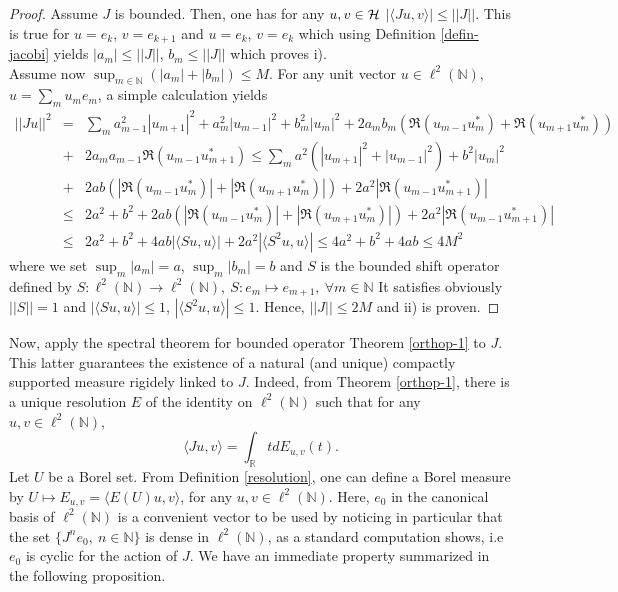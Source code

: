 \documentclass[a4paper,11pt,twoside]{article}
\numberwithin{equation}{section}
\theoremstyle{nonumberplain}
\newtheorem{proof}{Proof}
\begin{document}
\begin{proof}
Assume $J$ is bounded. Then, one has for any $u,v\in\cal{H}$ $|\langle Ju,v \rangle|\le ||J||$. This is true for $u=e_k$, $v=e_{k+1}$ and $u=e_k$, $v=e_k$ which using Definition \ref{defin-jacobi} yields $|a_m|\le||J||$, $b_m\le||J||$ which proves i). \\
Assume now $\sup_{m\in\mathbb{N}}(|a_m|+|b_m|)\le M$. For any unit vector $u\in\ell^2(\mathbb{N})$, $u=\sum_mu_me_m$, a simple calculation yields
\begin{eqnarray}
||Ju||^2&=&\sum_ma^2_{m-1}|u_{m+1}|^2+a^2_m|u_{m-1}|^2+b^2_m|u_m|^2+2a_mb_m(\Re(u_{m-1}u^*_m)+\Re(u_{m+1}u^*_m))\nonumber\\
&+&2a_ma_{m-1}\Re(u_{m-1}u^*_{m+1})\le\sum_ma^2(|u_{m+1}|^2+|u_{m-1}|^2)+b^2|u_m|^2\nonumber\\
&+&2ab(|\Re(u_{m-1}u^*_m)|+|\Re(u_{m+1}u^*_m)|)+2a^2|\Re(u_{m-1}u^*_{m+1})|\nonumber\\
&\le&2a^2+b^2+2ab(|\Re(u_{m-1}u^*_m)|+|\Re(u_{m+1}u^*_m)|)+2a^2|\Re(u_{m-1}u^*_{m+1})|\nonumber\\
&\le&2a^2+b^2+4ab|\langle Su,u \rangle|+2a^2|\langle S^2u,u\rangle|\le4a^2+b^2+4ab\le4M^2
\label{sum-ju-maj}
\end{eqnarray}
where we set $\sup_m|a_m|=a$, $\sup_m|b_m|=b$ and $S$ is the bounded shift operator defined by $
S:\ell^2(\mathbb{N})\to\ell^2(\mathbb{N}),\ S:e_m\mapsto e_{m+1},\ \forall m\in\mathbb{N}$
It satisfies obviously $||S||=1$ and $|\langle Su,u\rangle|\le1$, $|\langle S^2u,u \rangle|\le1$. Hence, $||J||\le2M$ and ii) is proven.
\end{proof} 
Now, apply the spectral theorem for bounded operator Theorem \ref{orthop-1} to $J$. This latter guarantees the existence of a natural (and unique) compactly supported measure rigidely linked to $J$. Indeed, from Theorem \ref{orthop-1}, there is a unique resolution $E$ of the identity on $\ell^2(\mathbb{N})$ such that for any $u,v\in\ell^2(\mathbb{N})$, 
\begin{equation}
\langle Ju,v \rangle=\int_\mathbb{R}tdE_{u,v}(t). 
\end{equation}
Let $U$ be a Borel set. From Definition \ref{resolution}, one can define a Borel measure by $U\mapsto E_{u,v}=\langle E(U)u,v \rangle$, for any $u,v\in\ell^2(\mathbb{N})$. Here, $e_0$ in the canonical basis of $\ell^2(\mathbb{N})$ is a convenient vector to be used by noticing in particular that the set $\{J^ne_0,\ n\in\mathbb{N}\}$ is dense in $\ell^2(\mathbb{N})$, as a standard computation shows, i.e $e_0$ is cyclic for the action of $J$. We have an immediate property summarized in the following proposition.
\end{document}
